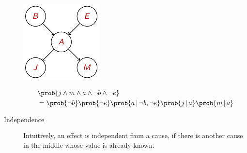 \begin{description}
\begin{example}
            \begin{minipage}{.3\linewidth}
                \centering
                \includegraphics[width=0.7\linewidth]{img/_global_semantics_example.pdf}
            \end{minipage}
            \begin{minipage}{.6\linewidth}
                \[ 
                    \begin{split}
                        &\prob{j \land m \land a \land \lnot b \land \lnot e} \\
                            &= \prob{\lnot b} \prob{\lnot e} \prob{a \,\vert\, \lnot b, \lnot e}
                                \prob{j \,\vert\, a} \prob{m \,\vert\, a}
                    \end{split}
                \]
            \end{minipage}
        \end{example}

    \item[Independence] 
        Intuitively, an effect is independent from a cause, 
        if there is another cause in the middle whose value is already known.
        \begin{example}
            \phantom{}


\end{example}
\end{description}

